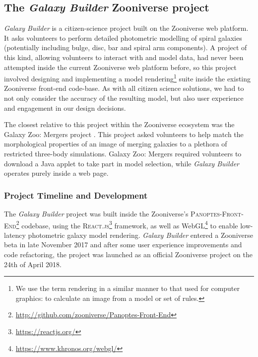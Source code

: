 \documentclass[main\.tex]{subfiles}
\begin{document}
\label{sec:method}

\subsection{The \textit{Galaxy Builder} Zooniverse project}

\textit{Galaxy Builder} is a citizen-science project built on the Zooniverse web platform. It asks volunteers to perform detailed photometric modelling of spiral galaxies (potentially including bulge, disc, bar and spiral arm components). A project of this kind, allowing volunteers to interact with and model data, had never been attempted inside the current Zooniverse web platform before, so this project involved designing and implementing a model rendering\footnote{We use the term rendering in a similar manner to that used for computer graphics: to calculate an image from a model or set of rules.} suite inside the existing Zooniverse front-end code-base. As with all citizen science solutions, we had to not only consider the accuracy of the resulting model, but also user experience and engagement in our design decisions.

The closest relative to this project within the Zooniverse ecosystem was the Galaxy Zoo: Mergers project \citep{Holincheck2016:1604.00435v1}. This project asked volunteers to help match the morphological properties of an image of merging galaxies to a plethora of restricted three-body simulations. Galaxy Zoo: Mergers required volunteers to download a Java applet to take part in model selection, while \textit{Galaxy Builder} operates purely inside a web page.

\subsubsection{Project Timeline and Development}

The \textit{Galaxy Builder} project was built inside the Zooniverse's \citep{Simpson:2014:ZOW:2567948.2579215} \textsc{Panoptes-Front-End}\footnote{\url{http://github.com/zooniverse/Panoptes-Front-End}} codebase, using the \textsc{React.js}\footnote{\url{https://reactjs.org/}} framework, as well as WebGL\footnote{\url{https://www.khronos.org/webgl/}} to enable low-latency photometric galaxy model rendering. \textit{Galaxy Builder} entered a Zooniverse beta in late November 2017 and after some user experience improvements and code refactoring, the project was launched as an official Zooniverse project on the 24th of April 2018.
\end{document}
